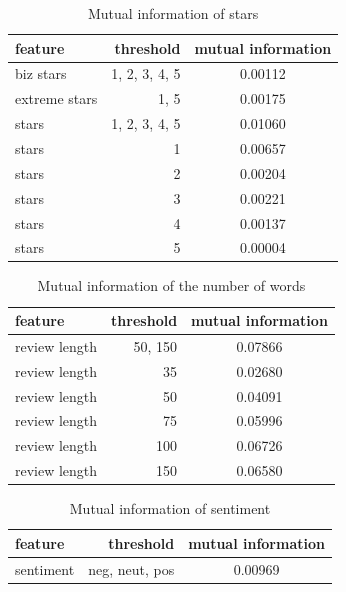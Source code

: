 \begin{table}[h!]

\centering
\begin{tabular}{lrS[table-format=3.2]}
\toprule
\textbf{feature} & \textbf{threshold} & \textbf{mutual information} \\
\midrule
biz stars & 1, 2, 3, 4, 5 & 0.00112 \\
extreme stars & 1, 5 & 0.00175 \\
stars & 1, 2, 3, 4, 5& 0.01060 \\
stars & 1 & 0.00657 \\
stars & 2 & 0.00204 \\
stars & 3 & 0.00221 \\
stars & 4 & 0.00137 \\
stars & 5 & 0.00004 \\
\bottomrule
\end{tabular}

\caption{Mutual information of stars}\label{tab:mi_stars}
\end{table}

\begin{table}[h!]

\centering
\begin{tabular}{lrS[table-format=3.2]}
\toprule
\textbf{feature} & \textbf{threshold} & \textbf{mutual information} \\
\midrule
review length & 50, 150 & 0.07866 \\
review length & 35 & 0.02680 \\
review length & 50 & 0.04091 \\
review length & 75 & 0.05996 \\
review length & 100 & 0.06726 \\
review length & 150 & 0.06580 \\

\bottomrule
\end{tabular}
\caption{Mutual information of the number of words}\label{tab:mi_words}
\end{table}

\begin{table}[h!]
\centering
\begin{tabular}{lrS[table-format=3.2]}
\toprule
\textbf{feature} & \textbf{threshold} & \textbf{mutual information} \\
\midrule
sentiment & neg, neut, pos & 0.00969 \\
\bottomrule
\end{tabular}
\caption{Mutual information of sentiment}\label{tab:mi_sentiment}
\end{table}



